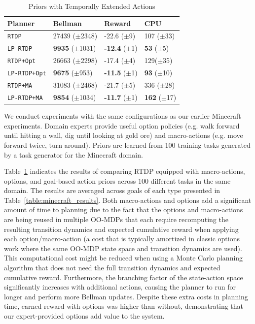 \documentclass[11pt]{article}
\begin{document}
\begin{table}
\centering
{}
\small
\begin{tabular}{@{}llll@{}}\toprule
Planner & Bellman & Reward & CPU \\ \midrule
\texttt{RTDP}   			&	27439 ($\pm$2348)		&	-22.6 ($\pm$9)		& 107 ($\pm$33) \\
\texttt{LP-RTDP} 			& 	{\bf 9935} ($\pm$1031)	&	{\bf -12.4} ($\pm$1)& {\bf 53} ($\pm$5) \\ \hline
\texttt{RTDP+Opt}  		&	26663 ($\pm$2298)		&	-17.4 ($\pm$4) 		& 129($\pm$35) \\
\texttt{LP-RTDP+Opt} 		& 	{\bf 9675} ($\pm$953)	&	{\bf -11.5} ($\pm$1)	&{\bf 93} ($\pm$10) \\ \hline
\texttt{RTDP+MA}  		&	31083 ($\pm$2468)		&	-21.7	 ($\pm$5)		&336 ($\pm$28) \\
\texttt{LP-RTDP+MA}  		& 	{\bf 9854} ($\pm$1034)	&	{\bf -11.7} ($\pm$1)	&{\bf 162} ($\pm$17) \\ %
\bottomrule
\end{tabular}
\caption{Priors with Temporally Extended Actions}
\label{table:temp_ext_act_results}
\end{table}

We conduct experiments with the same configurations as our earlier Minecraft experiments. Domain experts provide
useful option policies (e.g. walk forward until hitting a wall, dig until looking at gold ore) and macro-actions (e.g. move forward twice, turn around). Priors are learned from 100 training tasks generated by a task generator for the Minecraft domain.

Table~\ref{table:temp_ext_act_results} indicates the results of
comparing RTDP equipped with macro-actions, options, and goal-based action priors
across 100 different tasks in the same domain. The results are averaged across goals of each type
presented in Table~\ref{table:minecraft_results}. Both macro-actions
and options add a significant amount of time to planning due to the
fact that the options and macro-actions are being reused in
multiple OO-MDPs that each require recomputing the resulting transition
dynamics and expected cumulative reward when applying each
option/macro-action (a cost that is typically amortized in classic
options work where the same OO-MDP state space and transition dynamics
are used). This computational cost might be reduced when using a Monte
Carlo planning algorithm that does not need the full transition
dynamics and expected cumulative reward.  Furthermore, the branching
factor of the state-action space significantly increases with
additional actions, causing the planner to run for longer and perform
more Bellman updates.  Despite these extra costs in planning time,
earned reward with options was higher than without, demonstrating that
our expert-provided options add value to the system.
\end{document}

